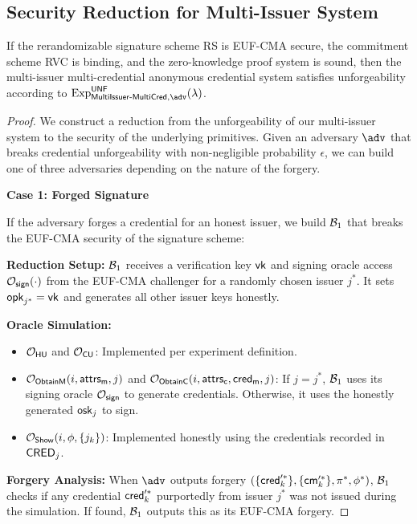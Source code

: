 \subsection{Security Reduction for Multi-Issuer System}

\begin{theorem}
If the rerandomizable signature scheme RS is EUF-CMA secure, the commitment scheme RVC is binding, and the zero-knowledge proof system is sound, then the multi-issuer multi-credential anonymous credential system satisfies unforgeability according to $\mathrm{Exp}^{\mathsf{UNF}}_{\mathsf{MultiIssuer\text{-}MultiCred}, \adv}(\lambda)$.
\end{theorem}

\begin{proof}
We construct a reduction from the unforgeability of our multi-issuer system to the security of the underlying primitives. Given an adversary $\adv$ that breaks credential unforgeability with non-negligible probability $\epsilon$, we can build one of three adversaries depending on the nature of the forgery.

\noindent \textbf{Case 1: Forged Signature}

\noindent If the adversary forges a credential for an honest issuer, we build $\mathcal{B}_1$ that breaks the EUF-CMA security of the signature scheme:

\noindent \textbf{Reduction Setup:} $\mathcal{B}_1$ receives a verification key $\mathsf{vk}$ and signing oracle access $\mathcal{O}_{\mathsf{sign}}(\cdot)$ from the EUF-CMA challenger for a randomly chosen issuer $j^*$. It sets $\mathsf{opk}_{j^*} = \mathsf{vk}$ and generates all other issuer keys honestly.

\noindent \textbf{Oracle Simulation:}
\begin{itemize}
    \item $\mathcal{O}_{\mathsf{HU}}$ and $\mathcal{O}_{\mathsf{CU}}$: Implemented per experiment definition.
    
    \item $\mathcal{O}_{\mathsf{ObtainM}}(i, \mathsf{attrs_m}, j)$ and $\mathcal{O}_{\mathsf{ObtainC}}(i, \mathsf{attrs_c}, \mathsf{cred_m}, j)$: If $j = j^*$, $\mathcal{B}_1$ uses its signing oracle $\mathcal{O}_{\mathsf{sign}}$ to generate credentials. Otherwise, it uses the honestly generated $\mathsf{osk}_j$ to sign.
    
    \item $\mathcal{O}_{\mathsf{Show}}(i, \phi, \{j_k\})$: Implemented honestly using the credentials recorded in $\mathsf{CRED}_j$.
\end{itemize}

\noindent \textbf{Forgery Analysis:} When $\adv$ outputs forgery $(\{\mathsf{cred}_k'^*\}, \{\mathsf{cm}_k'^*\}, \pi^*, \phi^*)$, $\mathcal{B}_1$ checks if any credential $\mathsf{cred}_k'^*$ purportedly from issuer $j^*$ was not issued during the simulation. If found, $\mathcal{B}_1$ outputs this as its EUF-CMA forgery.


\end{proof}
